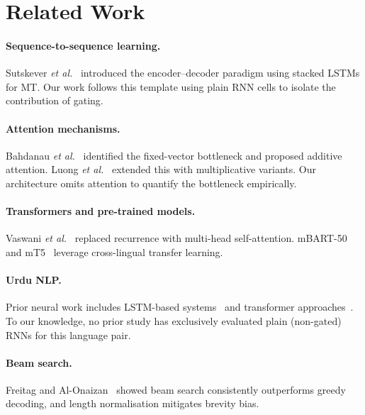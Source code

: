 \documentclass[runningheads]{llncs}
\begin{document}
\section{Related Work}
\label{sec:related}

\paragraph{Sequence-to-sequence learning.}
Sutskever \emph{et al.}~\cite{sutskever2014} introduced the encoder--decoder
paradigm using stacked LSTMs for MT. Our work follows this template using plain
RNN cells to isolate the contribution of gating.

\paragraph{Attention mechanisms.}
Bahdanau \emph{et al.}~\cite{bahdanau2015} identified the fixed-vector bottleneck
and proposed additive attention. Luong \emph{et al.}~\cite{luong2015} extended
this with multiplicative variants. Our architecture omits attention to quantify
the bottleneck empirically.

\paragraph{Transformers and pre-trained models.}
Vaswani \emph{et al.}~\cite{vaswani2017} replaced recurrence with multi-head
self-attention. mBART-50~\cite{liu2020} and mT5~\cite{xue2021} leverage
cross-lingual transfer learning.

\paragraph{Urdu NLP.}
Prior neural work includes LSTM-based systems~\cite{khani2021} and transformer
approaches~\cite{akhtar2022}. To our knowledge, no prior study has exclusively
evaluated plain (non-gated) RNNs for this language pair.

\paragraph{Beam search.}
Freitag and Al-Onaizan~\cite{freitag2017} showed beam search consistently
outperforms greedy decoding, and length normalisation mitigates brevity bias.

\end{document}
